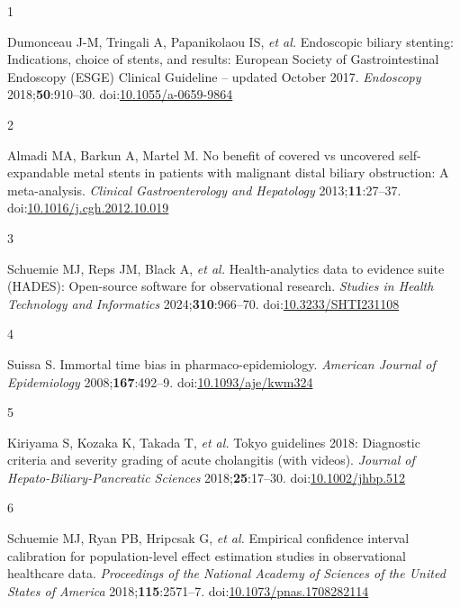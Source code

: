 \documentclass[
  12pt,
]{article}
\newlength{\cslhangindent}
\newlength{\csllabelwidth}
\newenvironment{CSLReferences}[2] %
 {\begin{list}{}{%
  \setlength{\itemindent}{0pt}
  \setlength{\leftmargin}{0pt}
  \setlength{\parsep}{0pt}
  \ifodd #1
   \setlength{\leftmargin}{\cslhangindent}
   \setlength{\itemindent}{-1\cslhangindent}
  \fi
  \setlength{\itemsep}{#2\baselineskip}}}
 {\end{list}}
\newcommand{\CSLLeftMargin}[1]{\parbox[t]{\csllabelwidth}{\strut#1\strut}}
\newcommand{\CSLRightInline}[1]{\parbox[t]{\linewidth - \csllabelwidth}{\strut#1\strut}}
\begin{document}
\label{refs}
\begin{CSLReferences}{0}{1}
\CSLLeftMargin{1 }%
\CSLRightInline{Dumonceau J-M, Tringali A, Papanikolaou IS, \emph{et al.} Endoscopic biliary stenting: Indications, choice of stents, and results: {European} {Society} of {Gastrointestinal} {Endoscopy} ({ESGE}) {Clinical} {Guideline} -- updated {October} 2017. \emph{Endoscopy} 2018;\textbf{50}:910--30. doi:\href{https://doi.org/10.1055/a-0659-9864}{10.1055/a-0659-9864}}

\CSLLeftMargin{2 }%
\CSLRightInline{Almadi MA, Barkun A, Martel M. No benefit of covered vs uncovered self-expandable metal stents in patients with malignant distal biliary obstruction: A meta-analysis. \emph{Clinical Gastroenterology and Hepatology} 2013;\textbf{11}:27--37. doi:\href{https://doi.org/10.1016/j.cgh.2012.10.019}{10.1016/j.cgh.2012.10.019}}

\CSLLeftMargin{3 }%
\CSLRightInline{Schuemie MJ, Reps JM, Black A, \emph{et al.} Health-analytics data to evidence suite (HADES): Open-source software for observational research. \emph{Studies in Health Technology and Informatics} 2024;\textbf{310}:966--70. doi:\href{https://doi.org/10.3233/SHTI231108}{10.3233/SHTI231108}}

\CSLLeftMargin{4 }%
\CSLRightInline{Suissa S. Immortal time bias in pharmaco-epidemiology. \emph{American Journal of Epidemiology} 2008;\textbf{167}:492--9. doi:\href{https://doi.org/10.1093/aje/kwm324}{10.1093/aje/kwm324}}

\CSLLeftMargin{5 }%
\CSLRightInline{Kiriyama S, Kozaka K, Takada T, \emph{et al.} Tokyo guidelines 2018: Diagnostic criteria and severity grading of acute cholangitis (with videos). \emph{Journal of Hepato-Biliary-Pancreatic Sciences} 2018;\textbf{25}:17--30. doi:\href{https://doi.org/10.1002/jhbp.512}{10.1002/jhbp.512}}

\CSLLeftMargin{6 }%
\CSLRightInline{Schuemie MJ, Ryan PB, Hripcsak G, \emph{et al.} Empirical confidence interval calibration for population-level effect estimation studies in observational healthcare data. \emph{Proceedings of the National Academy of Sciences of the United States of America} 2018;\textbf{115}:2571--7. doi:\href{https://doi.org/10.1073/pnas.1708282114}{10.1073/pnas.1708282114}}

\end{CSLReferences}
\end{document}

